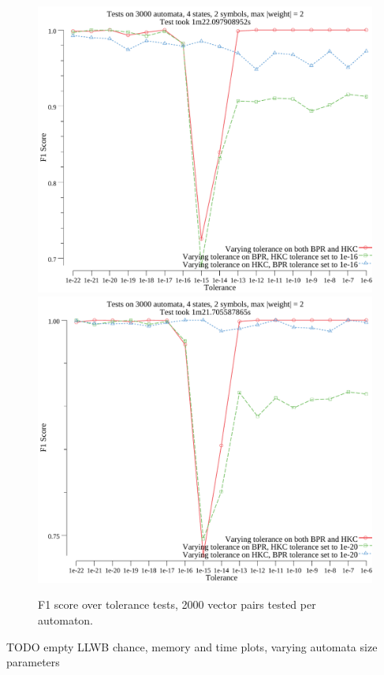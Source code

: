 \begin{figure}[htbp!]
    \centering
    \includegraphics[width=.75\textwidth]{./plots/f1-tol-1e-16.pdf}
    \includegraphics[width=.75\textwidth]{./plots/f1-tol-1e-20.pdf}
    \caption{F1 score over tolerance tests, 2000 vector pairs tested per automaton.}
    \label{fig:f1-2}
\end{figure}


TODO empty LLWB chance, memory and time plots, varying automata size parameters